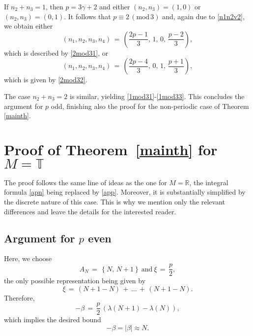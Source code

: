 \documentclass{amsart}
\newcommand{\R}{\mathbb{R}}
\begin{document}
If $n_2+n_3=1$, then $p=3\gamma+2$ and either $(n_2,n_3)=(1,0)$ or $(n_2,n_3)=(0,1)$. It follows that $ p\equiv 2\, (\text{mod}\,3)$ and, again due to \eqref{n1n2v2}, we obtain either
\[
(n_1,n_2,n_3,n_4)\,=\,\left(\frac{2p-1}{3},\,1,\,0,\,\frac{p-2}{3}\right),
\]
which is described by \eqref{2mod31}, or
\[
(n_1,n_2,n_3,n_4)\,=\,\left(\frac{2p-4}{3},\,0,\,1,\,\frac{p+1}{3}\right),
\]
which is given by \eqref{2mod32}.

The case $n_2+n_3=2$ is similar, yielding \eqref{1mod31}-\eqref{1mod33}. This concludes the argument for $p$ odd, finishing also the proof for the non-periodic case of Theorem \ref{mainth}.


\section{Proof of Theorem~\ref{mainth} for $M=\mathbb{T}$}
The proof follows the same line of ideas as the one for $M=\R$, the integral formula \eqref{apn} being replaced by \eqref{app}. Moreover, it is substantially simplified by the discrete nature of this case. This is why we mention only the relevant differences and leave the details for the interested reader.

\subsection{Argument for $p$ even} Here, we choose
\[
A_N\,=\,\left\{N,\, N+1\right\}\ \text{and} \ \xi\,=\,\frac{p}{2},
\]
the only possible representation being given by
\[
\xi\,=\,(N+1-N)\,+\,\ldots\,+\, (N+1-N).
\]
Therefore,
\[
-\beta\,=\,\frac{p}{2}\, \left(\lambda(N+1)-\lambda (N)\right),
\]
which implies the desired bound
\[
-\beta= |\beta| \approx N.
\]
\end{document}
